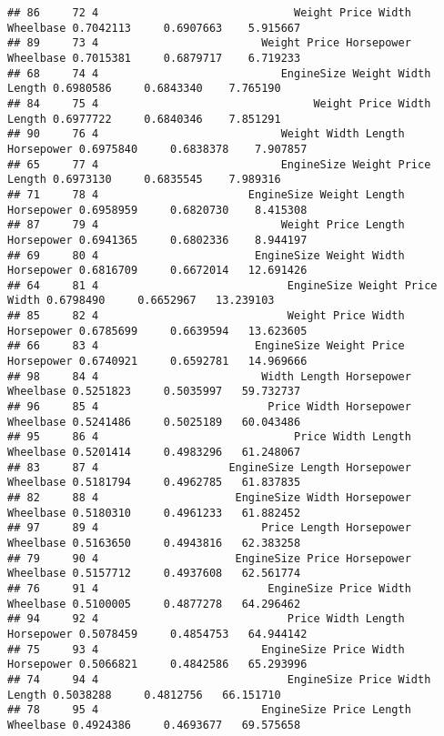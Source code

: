 \documentclass[
]{book}
\begin{document}
\begin{verbatim}
## 86     72 4                              Weight Price Width Wheelbase 0.7042113     0.6907663    5.915667
## 89     73 4                         Weight Price Horsepower Wheelbase 0.7015381     0.6879717    6.719233
## 68     74 4                            EngineSize Weight Width Length 0.6980586     0.6843340    7.765190
## 84     75 4                                 Weight Price Width Length 0.6977722     0.6840346    7.851291
## 90     76 4                            Weight Width Length Horsepower 0.6975840     0.6838378    7.907857
## 65     77 4                            EngineSize Weight Price Length 0.6973130     0.6835545    7.989316
## 71     78 4                       EngineSize Weight Length Horsepower 0.6958959     0.6820730    8.415308
## 87     79 4                            Weight Price Length Horsepower 0.6941365     0.6802336    8.944197
## 69     80 4                        EngineSize Weight Width Horsepower 0.6816709     0.6672014   12.691426
## 64     81 4                             EngineSize Weight Price Width 0.6798490     0.6652967   13.239103
## 85     82 4                             Weight Price Width Horsepower 0.6785699     0.6639594   13.623605
## 66     83 4                        EngineSize Weight Price Horsepower 0.6740921     0.6592781   14.969666
## 98     84 4                         Width Length Horsepower Wheelbase 0.5251823     0.5035997   59.732737
## 96     85 4                          Price Width Horsepower Wheelbase 0.5241486     0.5025189   60.043486
## 95     86 4                              Price Width Length Wheelbase 0.5201414     0.4983296   61.248067
## 83     87 4                    EngineSize Length Horsepower Wheelbase 0.5181794     0.4962785   61.837835
## 82     88 4                     EngineSize Width Horsepower Wheelbase 0.5180310     0.4961233   61.882452
## 97     89 4                         Price Length Horsepower Wheelbase 0.5163650     0.4943816   62.383258
## 79     90 4                     EngineSize Price Horsepower Wheelbase 0.5157712     0.4937608   62.561774
## 76     91 4                          EngineSize Price Width Wheelbase 0.5100005     0.4877278   64.296462
## 94     92 4                             Price Width Length Horsepower 0.5078459     0.4854753   64.944142
## 75     93 4                         EngineSize Price Width Horsepower 0.5066821     0.4842586   65.293996
## 74     94 4                             EngineSize Price Width Length 0.5038288     0.4812756   66.151710
## 78     95 4                         EngineSize Price Length Wheelbase 0.4924386     0.4693677   69.575658

\end{verbatim}
\end{document}
